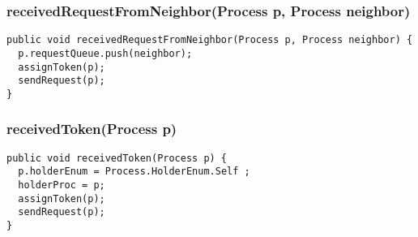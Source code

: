 \documentclass{article}
\begin{document}
		\subsubsection{receivedRequestFromNeighbor(Process p, Process neighbor)}
		\begin{lstlisting}
public void receivedRequestFromNeighbor(Process p, Process neighbor) {
  p.requestQueue.push(neighbor);
  assignToken(p);
  sendRequest(p);
}
		\end{lstlisting}
		
		\subsubsection{receivedToken(Process p)}
		\begin{lstlisting}
public void receivedToken(Process p) {
  p.holderEnum = Process.HolderEnum.Self ;
  holderProc = p;
  assignToken(p);
  sendRequest(p);		
}
		\end{lstlisting}
\end{document}
